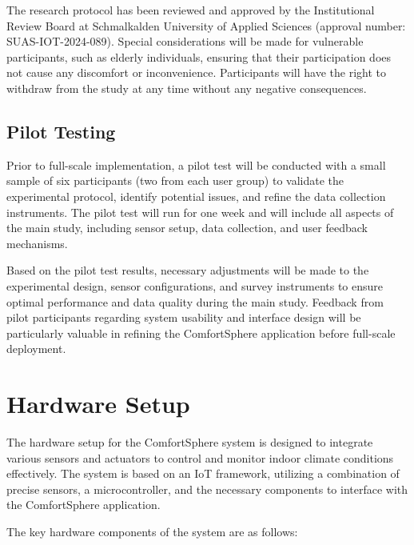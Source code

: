 \documentclass[a4paper]{scrartcl}
\begin{document}
    The research protocol has been reviewed and approved by the Institutional Review Board at Schmalkalden University of Applied Sciences (approval number: SUAS-IOT-2024-089). Special considerations will be made for vulnerable participants, such as elderly individuals, ensuring that their participation does not cause any discomfort or inconvenience. Participants will have the right to withdraw from the study at any time without any negative consequences.
    
    \subsection{Pilot Testing}
    Prior to full-scale implementation, a pilot test will be conducted with a small sample of six participants (two from each user group) to validate the experimental protocol, identify potential issues, and refine the data collection instruments. The pilot test will run for one week and will include all aspects of the main study, including sensor setup, data collection, and user feedback mechanisms.
    
    Based on the pilot test results, necessary adjustments will be made to the experimental design, sensor configurations, and survey instruments to ensure optimal performance and data quality during the main study. Feedback from pilot participants regarding system usability and interface design will be particularly valuable in refining the ComfortSphere application before full-scale deployment.

	\section{Hardware Setup}
	\label{sec:hardware setup}
	The hardware setup for the ComfortSphere system is designed to integrate various sensors and actuators to control and monitor indoor climate conditions effectively. The system is based on an IoT framework, utilizing a combination of precise sensors, a microcontroller, and the necessary components to interface with the ComfortSphere application. 

	The key hardware components of the system are as follows:
\end{document}
